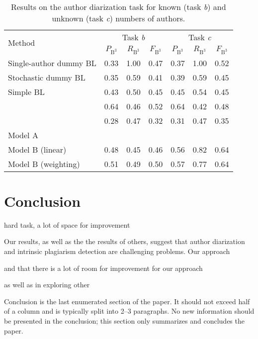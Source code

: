 \documentclass[10pt, a4paper]{article}
\begin{document}
\begin{table*}
	\caption{Results on the author diarization task for known (task \emph{b}) and unknown (task \emph{c}) numbers of authors.}
	\label{tab:results-task-b-c}
	\begin{center}
		\begin{tabular}{l|ccc|ccc}
			\toprule
			\multirow{2}{*}{Method} & \multicolumn{3}{c|}{Task \emph{b}} & \multicolumn{3}{c}{Task \emph{c}} \\
			\cmidrule{2-7}
			& $P_{\mathrm{B}^3}$ & $R_{\mathrm{B}^3}$ & $F_\mathrm{\mathrm{B}^3}$ & $P_{\mathrm{B}^3}$ & $R_{\mathrm{B}^3}$ & $F_\mathrm{\mathrm{B}^3}$ \\
			\midrule
			Single-author dummy BL 		& 0.33 & 1.00 & 0.47 & 0.37 & 1.00 & 0.52 \\
			Stochastic dummy BL 		& 0.35 & 0.59 & 0.41 & 0.39 & 0.59 & 0.45 \\
			Simple BL 					& 0.43 & 0.50 & 0.45 & 0.45 & 0.54 & 0.45 \\
			\midrule
			\citet{kuznetsov-2016}		& 0.64 & 0.46 & 0.52 & 0.64 & 0.42 & 0.48 \\
			\citet{sittar-2016} 		& 0.28 & 0.47 & 0.32 & 0.31 & 0.47 & 0.35 \\
			\midrule			
			Model A 					&  &  &  &  &  & \\			
			Model B (linear) 			& 0.48 & 0.45 & 0.46 & 0.56 & 0.82 & 0.64 \\
			Model B (weighting)			& 0.51 & 0.49 & 0.50 & 0.57 & 0.77 & 0.64 \\
			\bottomrule
		\end{tabular}
	\end{center}
\end{table*}

\section{Conclusion}

hard task, a lot of space for improvement

Our results, as well as the the results of others, suggest that author diarization and intrinsic plagiarism detection are challenging problems. Our approach 

 and that there is a lot of room for improvement for our approach
 
 as well as in exploring other 

Conclusion is the last enumerated section of the paper. It should not exceed half of a column and is typically split into 2--3 paragraphs. No new information should be presented in the conclusion; this section only summarizes and concludes the paper.
\end{document}
